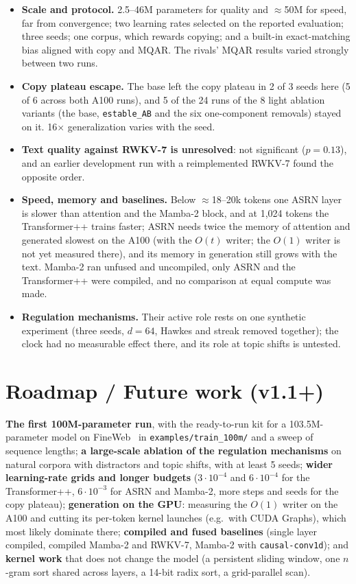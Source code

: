 \documentclass[11pt]{article}
\begin{document}
\begin{itemize}
\item \textbf{Scale and protocol.} 2.5--46M parameters for quality and $\approx$50M for speed, far from convergence;
  two learning rates selected on the reported evaluation; three seeds; one corpus, which rewards copying; and a built-in
  exact-matching bias aligned with copy and MQAR. The rivals' MQAR results varied strongly between two runs.
\item \textbf{Copy plateau escape.} The base left the copy plateau in 2 of 3 seeds here (5 of 6 across both A100 runs),
  and 5 of the 24 runs of the 8 light ablation variants (the base, \texttt{estable\_AB} and the six one-component
  removals) stayed on it. 16$\times$ generalization varies with the seed.
\item \textbf{Text quality against RWKV-7 is unresolved}: not significant ($p=0.13$), and an earlier development run
  with a reimplemented RWKV-7 found the opposite order.
\item \textbf{Speed, memory and baselines.} Below $\approx$18--20k tokens one ASRN layer is slower than attention and
  the Mamba-2 block, and at 1{,}024 tokens the Transformer++ trains faster; ASRN needs twice the memory of attention and
  generated slowest on the A100 (with the $O(t)$ writer; the $O(1)$ writer is not yet measured there), and its memory
  in generation still grows with the text. Mamba-2 ran unfused and uncompiled, only ASRN and the Transformer++ were
  compiled, and no comparison at equal compute was made.
\item \textbf{Regulation mechanisms.} Their active role rests on one synthetic experiment (three seeds, $d=64$, Hawkes
  and streak removed together); the clock had no measurable effect there, and its role at topic shifts is untested.
\end{itemize}

\section{Roadmap / Future work (v1.1+)}
\label{sec:future}

\textbf{The first 100M-parameter run}, with the ready-to-run kit for a 103.5M-parameter model on
FineWeb~\cite{penedo2024fineweb} in \nolinkurl{examples/train_100m/} and a sweep of sequence lengths; \textbf{a
large-scale ablation of the regulation mechanisms} on natural corpora with distractors and topic shifts, with at least 5
seeds; \textbf{wider learning-rate grids and longer budgets} ($3\cdot10^{-4}$ and $6\cdot10^{-4}$ for the Transformer++,
$6\cdot10^{-3}$ for ASRN and Mamba-2, more steps and seeds for the copy plateau); \textbf{generation on the
GPU}: measuring the $O(1)$ writer on the A100 and cutting its per-token kernel launches (e.g.\ with CUDA Graphs), which
most likely dominate there; \textbf{compiled and fused baselines} (single layer compiled, compiled Mamba-2 and RWKV-7,
Mamba-2 with \texttt{causal-conv1d}); and \textbf{kernel work} that does not change the model (a persistent sliding
window, one $n$-gram sort shared across layers, a 14-bit radix sort, a grid-parallel scan).
\end{document}
